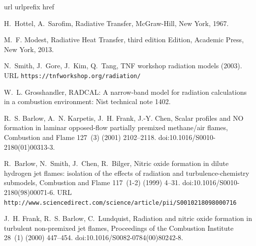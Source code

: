 \documentclass[preprint,12pt]{elsarticle}
\begin{document}

% 
% 

\begin{thebibliography}{10}
\expandafter\ifx\csname url\endcsname\relax
  \def\url#1{\texttt{#1}}\fi
\expandafter\ifx\csname urlprefix\endcsname\relax\def\urlprefix{URL }\fi
\expandafter\ifx\csname href\endcsname\relax
  \def\href#1#2{#2} \def\path#1{#1}\fi

H.~Hottel, A.~Sarofim, Radiative Transfer, {McGraw-Hill}, New York, 1967.

M.~F. Modest, Radiative Heat Transfer, third edition Edition, {Academic Press},
  New York, 2013.

N.~Smith, J.~Gore, J.~Kim, Q.~Tang,
  \href{https://tnfworkshop.org/radiation/}{{TNF} workshop radiation models}
  (2003).
\newline\urlprefix\url{https://tnfworkshop.org/radiation/}

W.~L. Grosshandler, {RADCAL}: A narrow-band model for radiation calculations in
  a combustion environment: Nist technical note 1402.

R.~S. Barlow, A.~N. Karpetis, J.~H. Frank, J.-Y. Chen, Scalar profiles and {NO}
  formation in laminar opposed-flow partially premixed methane/air flames,
  Combustion and Flame 127~(3) (2001) 2102--2118.
\newblock \href {http://dx.doi.org/10.1016/S0010-2180(01)00313-3}
  {\path{doi:10.1016/S0010-2180(01)00313-3}}.

R.~Barlow, N.~Smith, J.~Chen, R.~Bilger,
  \href{http://www.sciencedirect.com/science/article/pii/S0010218098000716}{Nitric
  oxide formation in dilute hydrogen jet flames: isolation of the effects of
  radiation and turbulence-chemistry submodels}, Combustion and Flame 117~(1-2)
  (1999) 4--31.
\newblock \href {http://dx.doi.org/10.1016/S0010-2180(98)00071-6}
  {\path{doi:10.1016/S0010-2180(98)00071-6}}.
\newline\urlprefix\url{http://www.sciencedirect.com/science/article/pii/S0010218098000716}

J.~H. Frank, R.~S. Barlow, C.~Lundquist, Radiation and nitric oxide formation
  in turbulent non-premixed jet flames, Proceedings of the Combustion Institute
  28~(1) (2000) 447--454.
\newblock \href {http://dx.doi.org/10.1016/S0082-0784(00)80242-8}
  {\path{doi:10.1016/S0082-0784(00)80242-8}}.


\end{thebibliography}
\end{document}
